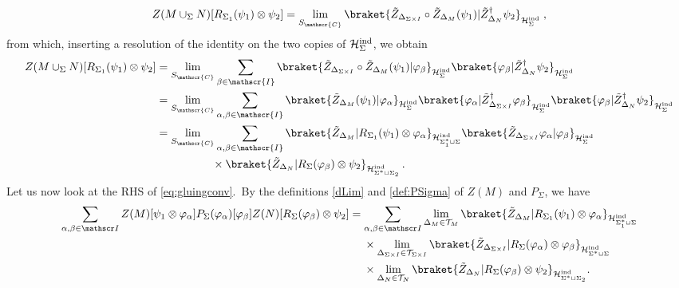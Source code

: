 \documentclass[11pt]{article}
\newcommand{\Hind}{\mathcal{H}_{\Sigma}^{\rm ind}}
\newcommand{\h}{\mathcal{H}}
\theoremstyle{definition}
\numberwithin{equation}{section}
\begin{document}
\begin{equation}
    Z(M\cup_\Sigma N)[R_{\Sigma_1}(\psi_1)\otimes\psi_2]=\lim_{S_{\mathscr{C}}}\braket{\tilde{Z}_{\Delta_{\Sigma\times I}}\circ \tilde{Z}_{\Delta_M}(\psi_1)|\tilde{Z}^{\dagger}_{\Delta_N}\psi_2}_{\Hind}\;,
\end{equation}
from which, inserting a resolution of the identity on the two copies of $\Hind$, we obtain
{\allowdisplaybreaks
\begin{align}
        Z(M\cup_\Sigma N)[R_{\Sigma_1}(\psi_1)\otimes\psi_2]&=\lim_{S_{\mathscr{C}}}\sum_{\beta\in\mathscr{I}}\braket{\tilde{Z}_{\Delta_{\Sigma\times I}}\circ \tilde{Z}_{\Delta_M}(\psi_1)|\varphi_\beta}_{\Hind}\braket{\varphi_\beta|\tilde{Z}^{\dagger}_{\Delta_N}\psi_2}_{\Hind}\nonumber\\
        &= \lim_{S_{\mathscr{C}}}\sum_{\alpha,\beta\in\mathscr{I}}\braket{\tilde{Z}_{\Delta_M}(\psi_1)|\varphi_\alpha}_{\Hind}\braket{\varphi_\alpha|\tilde{Z}_{\Delta_{\Sigma\times I}}^{\dagger}\varphi_\beta}_{\Hind}\braket{\varphi_\beta|\tilde{Z}^{\dagger}_{\Delta_N}\psi_2}_{\Hind}\nonumber\\
        &=\lim_{S_{\mathscr{C}}}\sum_{\alpha,\beta\in\mathscr{I}}\braket{\tilde{Z}_{\Delta_M}|R_{\Sigma_1}(\psi_1)\otimes\varphi_\alpha}_{\h^{\rm ind}_{\Sigma^*_1\sqcup\Sigma}}\braket{\tilde{Z}_{\Delta_{\Sigma\times I}}\varphi_\alpha|\varphi_\beta}_{\Hind}\\
        &\qquad\qquad\quad\times\braket{\tilde{Z}_{\Delta_N}|R_{\Sigma}(\varphi_\beta)\otimes\psi_2}_{\h^{\rm ind}_{\Sigma^*\sqcup\Sigma_2}}\,.\nonumber
\end{align}
}
Let us now look at the RHS of \eqref{eq:gluingconv}.~By the definitions \eqref{dLim} and \eqref{def:PSigma} of $Z(M)$ and $P_{\Sigma}$, we have
\begin{equation}
\begin{split}
    \sum_{\alpha,\beta\in\mathscr I}Z(M)[\psi_1\otimes \varphi_\alpha]P_{\Sigma}(\varphi_\alpha)[\varphi_\beta]Z(N)[R_\Sigma(\varphi_\beta)\otimes\psi_2]&=\sum_{\alpha,\beta\in\mathscr I}\lim_{\Delta_M\in\mathcal{T}_M}\braket{\tilde{Z}_{\Delta_M}|R_{\Sigma_1}(\psi_1)\otimes \varphi_\alpha}_{\h^{\rm ind}_{\Sigma^*_1\sqcup\Sigma}}\\
    &\quad\;\times\lim_{\Delta_{\Sigma\times I}\in\mathcal{T}_{\Sigma\times I}}\braket{\tilde{Z}_{\Delta_{\Sigma\times I}}|R_{\Sigma}(\varphi_{\alpha})\otimes\varphi_{\beta}}_{\h^{\rm ind}_{\Sigma^*\sqcup\Sigma}}\\
    &\quad\;\times\lim_{\Delta_N\in\mathcal{T}_N}\braket{\tilde{Z}_{\Delta_N}|R_\Sigma(\varphi_\beta)\otimes\psi_2}_{\h^{\rm ind}_{\Sigma^*\sqcup\Sigma_2}}.
\end{split}
\end{equation}
\end{document}
